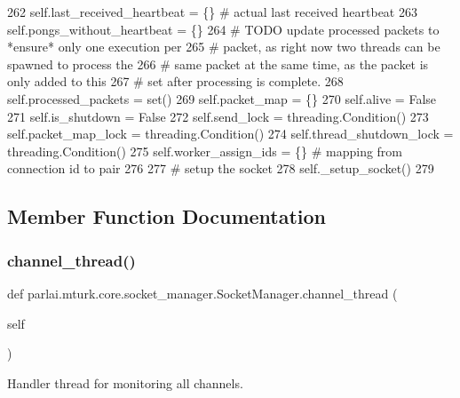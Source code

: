 \begin{DoxyCode}
262         self.last\_received\_heartbeat = \{\}  \textcolor{comment}{# actual last received heartbeat}
263         self.pongs\_without\_heartbeat = \{\}
264         \textcolor{comment}{# TODO update processed packets to *ensure* only one execution per}
265         \textcolor{comment}{# packet, as right now two threads can be spawned to process the}
266         \textcolor{comment}{# same packet at the same time, as the packet is only added to this}
267         \textcolor{comment}{# set after processing is complete.}
268         self.processed\_packets = set()
269         self.packet\_map = \{\}
270         self.alive = \textcolor{keyword}{False}
271         self.is\_shutdown = \textcolor{keyword}{False}
272         self.send\_lock = threading.Condition()
273         self.packet\_map\_lock = threading.Condition()
274         self.thread\_shutdown\_lock = threading.Condition()
275         self.worker\_assign\_ids = \{\}  \textcolor{comment}{# mapping from connection id to pair}
276 
277         \textcolor{comment}{# setup the socket}
278         self.\_setup\_socket()
279 
\end{DoxyCode}


\subsection{Member Function Documentation}
\mbox{\label{classparlai_1_1mturk_1_1core_1_1socket__manager_1_1SocketManager_a1518f69049fee8c6afb27120cdd6b1f3}} 
\subsubsection{\texorpdfstring{channel\+\_\+thread()}{channel\_thread()}}
{\footnotesize\ttfamily def parlai.\+mturk.\+core.\+socket\+\_\+manager.\+Socket\+Manager.\+channel\+\_\+thread (\begin{DoxyParamCaption}\item[{}]{self }\end{DoxyParamCaption})}

\begin{DoxyVerb}Handler thread for monitoring all channels.
\end{DoxyVerb}
 

